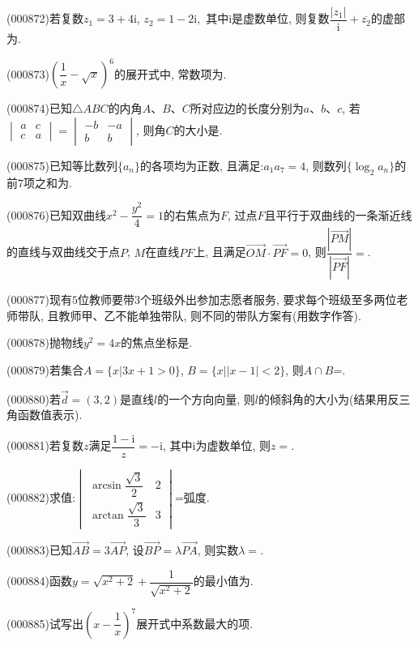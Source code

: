 \item (000872)若复数$z_1=3+4\mathrm{i}$, $z_2=1-2\mathrm{i},$ 其中$\mathrm{i}$是虚数单位, 则复数$\dfrac{|z_1|}{\mathrm{i}}+\overline{z_2}$的虚部为.
\item (000873)$(\dfrac1x-\sqrt x)^6$的展开式中, 常数项为.
\item (000874)已知$\triangle  ABC$的内角$A$、$B$、$C$所对应边的长度分别为$a$、$b$、$c$, 若$\begin{vmatrix}a & c \\ c & a\end{vmatrix} = \begin{vmatrix}-b & -a \\ b & b\end{vmatrix}$, 则角$C$的大小是.
\item (000875)已知等比数列$\{a_n\}$的各项均为正数, 且满足:$a_1a_7=4$, 则数列$\{\log_2a_n\}$的前$7$项之和为.
\item (000876)已知双曲线$x^2-\dfrac{y^2}4=1$的右焦点为$F$, 过点$F$且平行于双曲线的一条渐近线的直线与双曲线交于点$P$, $M$在直线$PF$上, 且满足$\overrightarrow{OM}\cdot \overrightarrow{PF}=0$, 则$\dfrac{|\overrightarrow{PM}|}{|\overrightarrow{PF}|}=$.
\item (000877)现有$5$位教师要带$3$个班级外出参加志愿者服务, 要求每个班级至多两位老师带队, 且教师甲、乙不能单独带队, 则不同的带队方案有(用数字作答).
\item (000878)抛物线$y^2=4x$的焦点坐标是.
\item (000879)若集合$A=\{x|3x+1>0\}$, $B=\{x||x-1|<2\}$, 则$A\cap B$=.
\item (000880)若$\overrightarrow d=(3,2)$是直线$l$的一个方向向量, 则$l$的倾斜角的大小为(结果用反三角函数值表示).
\item (000881)若复数$z$满足$\dfrac{1-\mathrm{i}}z=-\mathrm{i}$, 其中$\mathrm{i}$为虚数单位, 则$z=$.
\item (000882)求值:$\begin{vmatrix}\arcsin\dfrac{\sqrt3}2 & 2  \\ \arctan\dfrac{\sqrt3}3 & 3  \end{vmatrix}$=弧度.
\item (000883)已知$\overrightarrow{AB}=3\overrightarrow{AP}$, 设$\overrightarrow{BP}=\lambda \overrightarrow{PA}$, 则实数$\lambda=$.
\item (000884)函数$y=\sqrt{x^2+2}+\dfrac1{\sqrt{x^2+2}}$的最小值为.
\item (000885)试写出$(x-\dfrac1x)^7$展开式中系数最大的项.

